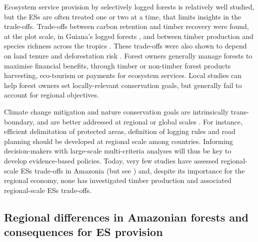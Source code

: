 \documentclass[12pt]{article}
\begin{document}
Ecosystem service provision by selectively logged forests is relatively well studied, but the ESs are often treated one or two at a time, that limits insights in the trade-offs. Trade-offs between carbon retention and timber recovery were found, at the plot scale, in Guiana's logged forests \cite{Roopsind2018}, and between timber production and species richness across the tropics \cite{Burivalova2014}. These trade-offs were also shown to depend on land tenure and deforestation risk \cite{Griscom2018}. Forest owners generally manage forests to maximise financial benefits, through timber or non-timber forest products harvesting, eco-tourism or payments for ecosystem services. Local studies can help forest owners set locally-relevant conservation goals, but generally fail to account for regional objectives.

Climate change mitigation and nature conservation goals are intrinsically trans-boundary, and are better addressed at regional or global scales \cite{Hein2006}. For instance, efficient delimitation of protected areas, definition of logging rules and road planning should be developed at regional scale among countries. Informing decision-makers with large-scale multi-criteria analyses will thus be key to develop evidence-based policies. Today, very few studies have assessed regional-scale ESs trade-offs in Amazonia (but see \cite{OConnell2018}) and, despite its importance for the regional economy, none has investigated timber production and associated regional-scale ESs trade-offs.

\subsection*{Regional differences in Amazonian forests and consequences for ES provision}
            	
\end{document}

